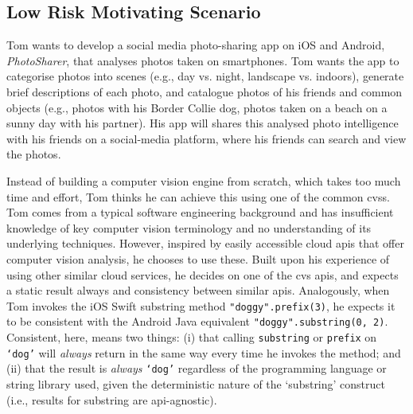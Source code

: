 \subsection{Low Risk Motivating Scenario}
\label{ssec:introduction:motivation:scenario:pam}

Tom wants to develop a social media photo-sharing app on iOS and Android, \textit{PhotoSharer}, that analyses photos taken on smartphones. Tom wants the app to categorise photos into scenes (e.g., day vs. night, landscape vs. indoors), generate brief descriptions of each photo, and catalogue photos of his friends and common objects (e.g., photos with his Border Collie dog, photos taken on a beach on a sunny day with his partner). His app will shares this analysed photo intelligence with his friends on a social-media platform, where his friends can search and view the photos.

Instead of building a computer vision engine from scratch, which takes too much time and effort, Tom thinks he can achieve this using one of the common \glspl{cvs}. Tom comes from a typical software engineering background and has insufficient knowledge of key computer vision terminology and no understanding of its underlying techniques. However, inspired by easily accessible cloud \glspl{api} that offer computer vision analysis, he chooses to use these. Built upon his experience of using other similar cloud services, he decides on one of the \gls{cvs} \glspl{api}, and expects a static result always and consistency between similar \glspl{api}. Analogously, when Tom invokes the iOS Swift substring method \texttt{"doggy".prefix(3)}, he expects it to be consistent with the Android Java equivalent \texttt{"doggy".substring(0, 2)}. Consistent, here, means two things: (i) that calling \texttt{substring} or \texttt{prefix} on \texttt{`dog'} will \textit{always} return in the same way every time he invokes the method; and (ii) that the result is \textit{always} \texttt{`dog'} regardless of the programming language or string library used, given the deterministic nature of the `substring' construct (i.e., results for substring are \gls{api}-agnostic). 



